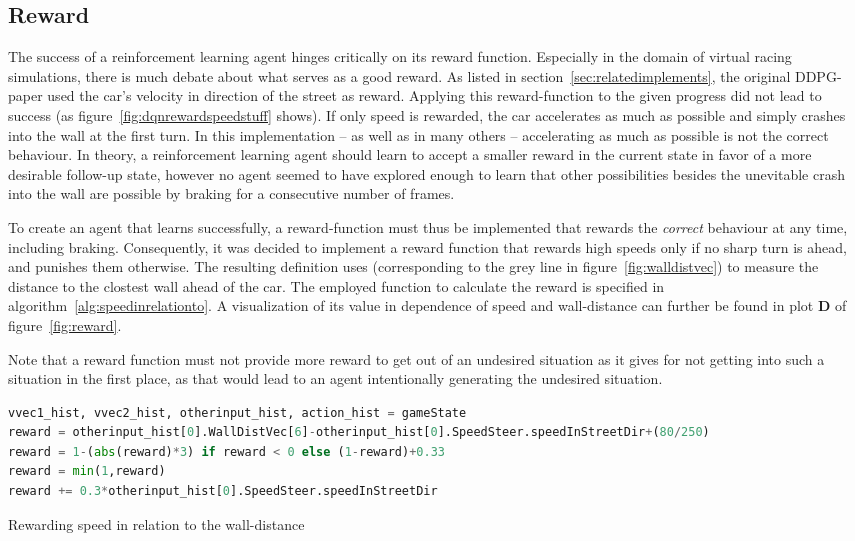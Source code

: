 \subsection{Reward}
		
\label{sec:reward}		
		
The success of a reinforcement learning agent hinges critically on its reward function. Especially in the domain of virtual racing simulations, there is much debate about what serves as a good reward. As listed in section~\ref{sec:relatedimplements}, the original DDPG-paper \cite{lillicrap_continuous_2015} used the car's velocity in direction of the street as reward. Applying this reward-function to the given progress did not lead to success (as figure~\ref{fig:dqnrewardspeedstuff} shows). If only speed is rewarded, the car accelerates as much as possible and simply crashes into the wall at the first turn. In this implementation -- as well as in many others -- accelerating as much as possible is not the correct behaviour. In theory, a reinforcement learning agent should learn to accept a smaller reward in the current state in favor of a more desirable follow-up state, however no agent seemed to have explored enough to learn that other possibilities besides the unevitable crash into the wall are possible by braking for a consecutive number of frames. 

To create an agent that learns successfully, a reward-function must thus be implemented that rewards the \textit{correct} behaviour at any time, including braking. Consequently, it was decided to implement a reward function that rewards high speeds only if no sharp turn is ahead, and punishes them otherwise. The resulting definition uses  (corresponding to the grey line in figure~\ref{fig:walldistvec}) to measure the distance to the clostest wall ahead of the car. The employed function to calculate the reward is specified in algorithm~\ref{alg:speedinrelationto}. A visualization of its value in dependence of speed and wall-distance can further be found in plot \textbf{D} of figure~\ref{fig:reward}.

Note that a reward function must not provide more reward to get out of an undesired situation as it gives for not getting into such a situation in the first place, as that would lead to an agent intentionally generating the undesired situation.

\begin{algorithm}[h]
	\begin{lstlisting}[language=Python, style=Python, frame=none]
vvec1_hist, vvec2_hist, otherinput_hist, action_hist = gameState
reward = otherinput_hist[0].WallDistVec[6]-otherinput_hist[0].SpeedSteer.speedInStreetDir+(80/250)
reward = 1-(abs(reward)*3) if reward < 0 else (1-reward)+0.33
reward = min(1,reward)
reward += 0.3*otherinput_hist[0].SpeedSteer.speedInStreetDir
	\end{lstlisting}%
	\caption{Rewarding speed in relation to the wall-distance}
	\label{alg:speedinrelationto}
\end{algorithm}


